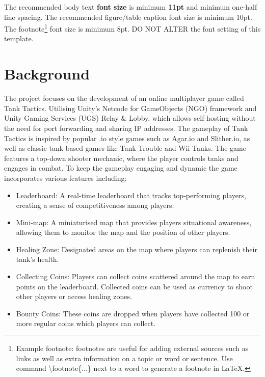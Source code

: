 The recommended body text \textbf{font size} is minimum \textbf{11pt} and minimum one-half line spacing. The recommended figure/table caption font size is minimum 10pt. The footnote\footnote{Example footnote: footnotes are useful for adding external sources such as links as well as extra information on a topic or word or sentence. Use command \textbackslash footnote\{...\} next to a word to generate a footnote in \LaTeX.} font size is minimum 8pt. DO NOT ALTER the font setting of this template.   

\section{Background}
\label{sec:into_back}
The project focuses on the development of an online multiplayer game called Tank Tactics. Utilising Unity's Netcode for GameObjects (NGO) framework and Unity Gaming Services (UGS) Relay \& Lobby, which allows self-hosting without the need for port forwarding and sharing IP addresses. The gameplay of Tank Tactics is inspired by popular .io style games such as Agar.io and Slither.io, as well as classic tank-based games like Tank Trouble and Wii Tanks. The game features a top-down shooter mechanic, where the player controls tanks and engages in combat. To keep the gameplay engaging and dynamic the game incorporates various features including:
\begin{itemize}
    \item Leaderboard: A real-time leaderboard that tracks top-performing players, creating a sense of competitiveness among players.
    \item Mini-map: A miniaturised map that provides players situational awareness, allowing them to monitor the map and the position of other players.
    \item Healing Zone: Designated areas on the map where players can replenish their tank's health.
    \item Collecting Coins: Players can collect coins scattered around the map to earn points on the leaderboard. Collected coins can be used as currency to shoot other players or access healing zones.
    \item Bounty Coins: These coins are dropped when players have collected 100 or more regular coins which players can collect.
\end{itemize}

